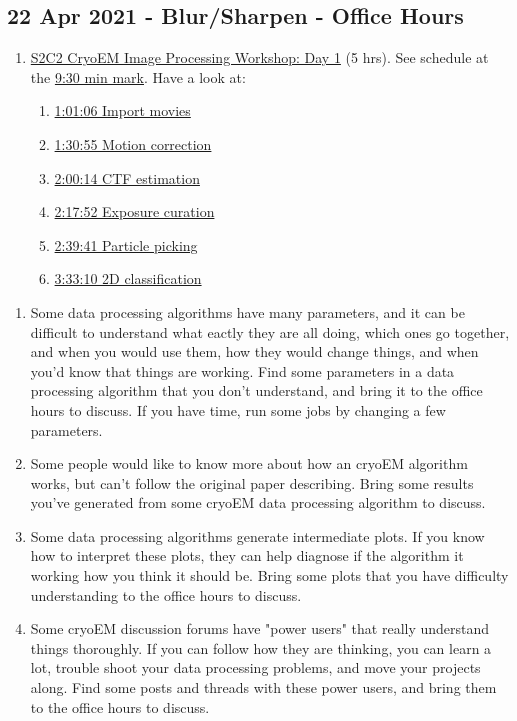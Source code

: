 \documentclass[11pt, oneside]{article}   	%
\begin{document}
\subsection{22 Apr 2021 - Blur/Sharpen - Office Hours }
\begin{enumerate}
	\item \href{https://youtu.be/eRPue0-Pkw4}{S2C2 CryoEM Image Processing Workshop: Day 1} (5 hrs). See schedule at the \href{https://youtu.be/eRPue0-Pkw4?t=570}{9:30 min mark}. Have a look at:
	\begin{enumerate}
		\item \href{https://www.youtube.com/watch?v=eRPue0-Pkw4&t=3666s}{1:01:06 Import movies}
		\item \href{https://www.youtube.com/watch?v=eRPue0-Pkw4&t=5455s}{1:30:55 Motion correction}
		\item \href{https://www.youtube.com/watch?v=eRPue0-Pkw4&t=7214s}{2:00:14 CTF estimation}
		\item \href{https://www.youtube.com/watch?v=eRPue0-Pkw4&t=8272s}{2:17:52 Exposure curation}
		\item \href{https://www.youtube.com/watch?v=eRPue0-Pkw4&t=9581s}{2:39:41 Particle picking}
		\item \href{https://www.youtube.com/watch?v=eRPue0-Pkw4&t=12790s}{3:33:10 2D classification}
	\end{enumerate}
\end{enumerate}
\begin{enumerate}
	\item Some data processing algorithms have many parameters, and it can be difficult to understand what eactly they are all doing, which ones go together, and when you would use them, how they would change things, and when you'd know that things are working. Find some parameters in a data processing algorithm that you don't understand, and bring it to the office hours to discuss. If you have time, run some jobs by changing a few parameters.
	\item Some people would like to know more about how an cryoEM algorithm works, but can't follow the original paper describing. Bring some results you've generated from some cryoEM data processing algorithm to discuss.
	\item Some data processing algorithms generate intermediate plots. If you know how to interpret these plots, they can help diagnose if the algorithm it working how you think it should be. Bring some plots that you have difficulty understanding to the office hours to discuss.  
	\item Some cryoEM discussion forums have "power users" that really understand things thoroughly. If you can follow how they are thinking, you can learn a lot, trouble shoot your data processing problems, and move your projects along. Find some posts and threads with these power users, and bring them to the office hours to discuss.
\end{enumerate}
\end{document}

